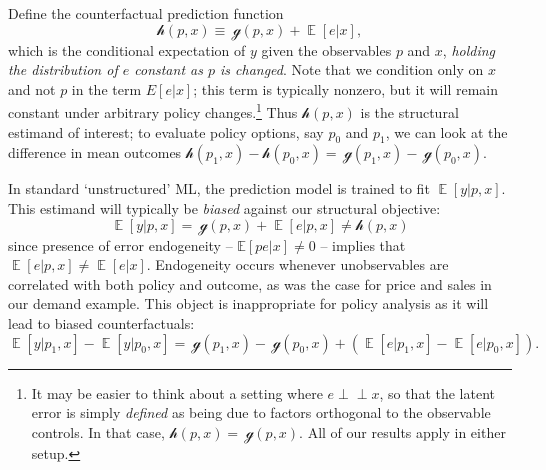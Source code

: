 \documentclass[12pt]{article}
\newcommand{\ds}[1]{\mathds{#1}}
\newcommand{\indep}{\perp\!\!\!\!\!\perp}
\newcommand{\outcome}{\ensuremath{y}}
\newcommand{\struct}{\ensuremath{~\mathscr{g}}}
\newcommand{\cf}{\ensuremath{\mathscr{h}}}
\newcommand{\price}{\ensuremath{p}}
\DeclareMathOperator*{\E}{\mathds{E}}
\begin{document}
Define the counterfactual prediction function 
\begin{equation}
\cf(\price,x) \equiv \struct (\price,x) + \E[e|x],
\end{equation}
 which is the conditional expectation of $\outcome$ given the observables $\price$ and $x$, \emph{holding the distribution of $e$ constant as $\price$ is changed}.
Note that we condition only on $x$ and not $\price$ in the term $E[e|x]$; this term is typically nonzero, but it will remain constant under arbitrary policy changes.\footnote{It may be easier to think about a setting where $e\indep x$, so that the latent error is simply {\it defined} as being due to factors orthogonal to the observable controls.  In that case, $\cf(\price,x) = \struct (\price,x)$.  All of our results apply in either setup. }  Thus $\cf(\price,x)$ is the structural estimand of interest;
 to evaluate policy options, say $\price_0$ and $\price_1$, we can look at the difference in mean outcomes $\cf(\price_1,x)-\cf(\price_0,x) = \struct(\price_1,x)-\struct(\price_0,x)$.

In standard `unstructured' ML, the prediction model is trained to 
fit $\E[y|\price, x]$.  This estimand will typically be {\it biased} against our structural objective: 
\begin{equation}\label{eq:unsctruct}
\E[y|\price, x] = \struct (\price,x) + \E[e|\price,x] \neq \cf(\price,x)
\end{equation}
since presence of error endogeneity -- $\ds{E}[pe|x] \neq 0$ -- implies that $\E[e|\price,x] \neq \E[e|x]$.  Endogeneity occurs whenever unobservables are correlated with both policy and  outcome, as was the case for price and sales in our demand example.  This object is inappropriate for policy analysis as it will lead to biased counterfactuals: 
\begin{equation}
\E[y|\price_1, x] - \E[y|\price_0, x] = \struct (\price_1,x) - \struct (\price_0,x) + \left(\E[e|\price_1,x]-\E[e|\price_0,x]\right).
\end{equation}
\end{document}

